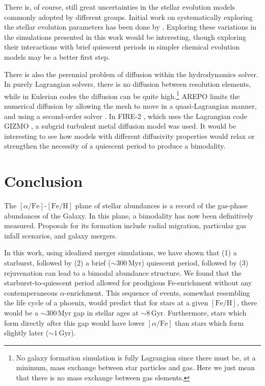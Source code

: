 \documentclass[twocolumn,linenumbers,trackchanges]{aastex631}
\newcommand{\Gyr}{\ensuremath{\textrm{Gyr}}}
\newcommand{\Myr}{\ensuremath{\textrm{Myr}}}
\newcommand{\FeH}{\ensuremath{[\textrm{Fe}/\textrm{H}]}}
\newcommand{\alphaFe}{\ensuremath{[\alpha/\textrm{Fe}]}}
\begin{document}
There is, of course, still great uncertainties in the stellar evolution models commonly adopted by different groups. Initial work on systematically exploring the stellar evolution parameters has been done by \citet{2017A&A...605A..59R,2021MNRAS.508.3365B}. Exploring these variations in the simulations presented in this work would be interesting, though exploring their interactions with brief quiescent periods in simpler chemical evolution models may be a better first step.

There is also the perennial problem of diffusion within the hydrodynamics solver. In purely Lagrangian solvers, there is no diffusion between resolution elements, while in Eulerian codes the diffusion can be quite high.\footnote{No galaxy formation simulation is fully Lagrangian since there must be, at a minimum, mass exchange between star particles and gas. Here we just mean that there is no mass exchange between gas elements.} AREPO limits the numerical diffusion by allowing the mesh to move in a quasi-Lagrangian manner, and using a second-order solver \citep{2010MNRAS.401..791S}. In FIRE-2 \citep{2018MNRAS.480..800H}, which uses the Lagrangian code GIZMO \citep{2015MNRAS.450...53H}, a subgrid turbulent metal diffusion model was used. It would be interesting to see how models with different diffusivity properties would relax or strengthen the necessity of a quiescent period to produce a bimodality.

\section{Conclusion}\label{sec:conclusion}
The \alphaFe{}-\FeH{} plane of stellar abundances is a record of the gas-phase abundances of the Galaxy. In this plane, a bimodality has now been definitively measured. Proposals for its formation include radial migration, particular gas infall scenarios, and galaxy mergers.

In this work, using idealized merger simulations, we have shown that (1) a starburst, followed by (2) a brief ($\sim300\,\Myr$) quiescent period, followed by (3) rejuvenation can lead to a bimodal abundance structure. We found that the starburst-to-quiescent period allowed for prodigious Fe-enrichment without any contemperaneous $\alpha$-enrichment. This sequence of events, somewhat resembling the life cycle of a phoenix, would predict that for stars at a given \FeH{}, there would be a $\sim300\,\Myr$ gap in stellar ages at $\sim8\,\Gyr$. Furthermore, stars which form directly after this gap would have lower \alphaFe{} than stars which form slightly later ($\sim1\,\Gyr$).
\end{document}
